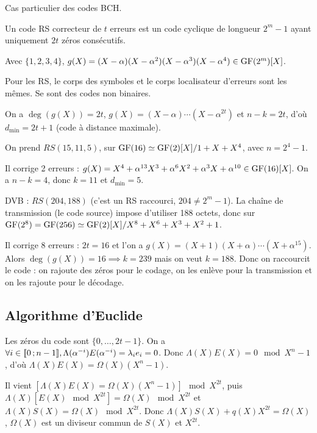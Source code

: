 Cas particulier des codes BCH.

\begin{defn}
	Un code RS correcteur de $t$ erreurs est un code cyclique de longueur $2^m - 1$ ayant uniquement $2t$ zéros consécutifs.
\end{defn}

\begin{ex}
	Avec $\{ 1, 2, 3, 4 \}$, $g(X) = (X - \alpha)(X - \alpha^2)(X - \alpha^3)(X - \alpha^4) \in \mathrm{GF}(2^m)[X]$.
\end{ex}

Pour les RS, le corps des symboles et le corps localisateur d'erreurs sont les mêmes.
Se sont des codes non binaires.

On a $\deg(g(X)) = 2t$, $g(X) = (X - \alpha) \cdots (X - \alpha^{2t})$ et $n - k = 2t$, d'où $d_\min = 2t + 1$ (code à distance maximale).

\begin{ex}
	On prend $RS(15,11,5)$, sur $\mathrm{GF}(16) \simeq \mathrm{GF}(2)[X] / 1 + X + X^4$, avec $n = 2^4 - 1$.
	
	Il corrige 2 erreurs : $g(X) = X^4 + \alpha^{13} X^3 + \alpha^6 X^2 + \alpha^3 X + \alpha^{10} \in \mathrm{GF}(16)[X]$.
	On a $n - k = 4$, donc $k = 11$ et $d_\min = 5$.
\end{ex}

\begin{ex}
	DVB : $RS(204,188)$ (c'est un RS raccourci, $204 \neq 2^m - 1$).
	La chaîne de transmission (le code source) impose d'utiliser 188 octets, donc sur $\mathrm{GF}(2^8) = \mathrm{GF}(256) \simeq \mathrm{GF}(2)[X] / X^8 + X^6 + X^3 + X^2 + 1$.
	
	Il corrige 8 erreurs : $2t = 16$ et l'on a $g(X) = (X + 1)(X + \alpha) \cdots (X + \alpha^{15})$.
	Alors $\deg(g(X)) = 16 \implies k = 239$ mais on veut $k = 188$.
	Donc on raccourcit le code : on rajoute des zéros pour le codage, on les enlève pour la transmission et on les rajoute pour le décodage.
\end{ex}


\subsection{Algorithme d'Euclide}

	Les zéros du code sont $\{ 0,\ldots,2t - 1 \}$.
	On a $\forall i \in \mathopen{}\mathclose{\left[\![0\mathclose{}\mathpunct{};n - 1\right]\!]}, \Lambda(\alpha^{-i}) E(\alpha^{-i}) = \lambda_i e_i = 0$.
	Donc $\Lambda(X) E(X) = 0 \mod{X^n - 1}$, d'où $\Lambda(X)E(X) = \Omega(X) (X^n - 1)$.
	
	Il vient $[\Lambda(X)E(X) = \Omega(X) (X^n - 1)] \mod{X^{2t}}$, puis $\Lambda(X) [E(X) \mod{X^{2t}}] = \Omega(X) \mod{X^{2t}}$ et $\Lambda(X) S(X) = \Omega(X) \mod{X^{2t}}$.
	Donc $\Lambda(X)S(X) + q(X)X^{2t} = \Omega(X)$, $\Omega(X)$ est un diviseur commun de $S(X)$ et $X^{2t}$.

